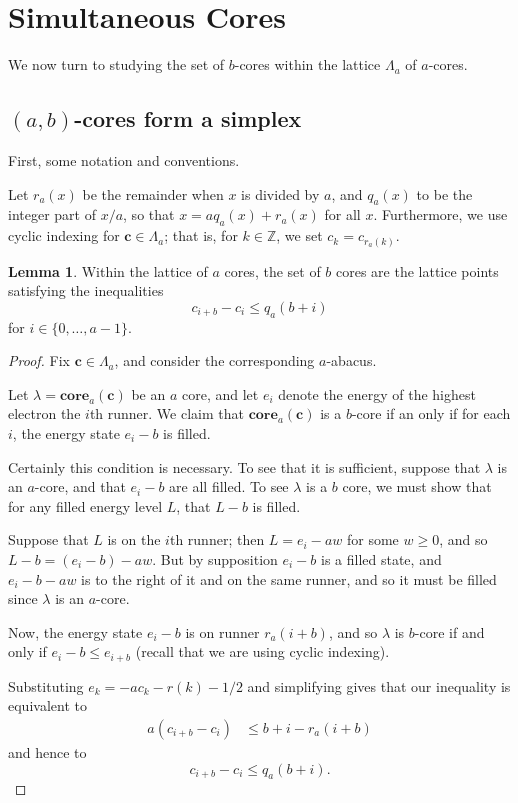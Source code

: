 \documentclass{amsart}[12pt]
\theoremstyle{definition}
\newtheorem{lemma}[dummy]{Lemma}
\newcommand{\Z}{\mathbb{Z}}
\newcommand{\core}{\mathbf{core}}
\begin{document}
\section{Simultaneous Cores}

We now turn to studying the set of $b$-cores within the lattice
$\Lambda_a$ of $a$-cores.
\subsection{\texorpdfstring{$(a,b)$}{(a,b)}-cores form a simplex}

First, some notation and conventions.

Let $r_a(x)$ be the remainder when $x$ is divided by $a$, and $q_a(x)$ to be the integer part of $x/a$, so that $x=aq_a(x)+r_a(x)$ for all $x$.
Furthermore, we use cyclic indexing for $\mathbf{c}\in\Lambda_a$;
that is, for $k\in\Z$, we set $c_k=c_{r_a(k)}$.

\begin{lemma}
Within the lattice of $a$ cores, the set of $b$ cores are the
lattice points satisfying the inequalities $$c_{i+b}-c_{i}\leq q_a(b+i)$$
for $i\in\{0,\dots,a-1\}$.
\end{lemma}

\begin{proof}

Fix $\mathbf{c}\in\Lambda_a$, and consider the corresponding
$a$-abacus.

Let $\lambda=\core_a(\mathbf{c})$ be an $a$ core, and let $e_i$ denote the energy of the highest electron the $i$th runner.  We claim that $\core_a(\mathbf{c})$ is a $b$-core if an only if for each $i$, the energy state $e_i-b$ is filled.

Certainly this condition is necessary.  To see that it is sufficient, suppose that $\lambda$ is an $a$-core, and that $e_i-b$ are all filled.  To see $\lambda$ is a $b$ core, we must show that for any filled energy level $L$, that $L-b$ is filled.  

Suppose that $L$ is on the $i$th runner; then $L=e_i-aw$ for some $w\geq 0$, and so $L-b=(e_i-b)-aw$.  But by supposition $e_i-b$ is a filled state, and $e_i-b-aw$ is to the right of it and on the same runner, and so it must be filled since $\lambda$ is an $a$-core.

Now, the energy state $e_{i}-b$ is on runner $r_a(i+b)$, and so
$\lambda$ is $b$-core if and only if $e_{i}-b\leq e_{i+b}$ (recall that we are using cyclic indexing).

Substituting $e_k=-ac_k-r(k)-1/2$ and simplifying gives that our inequality is equivalent to
\begin{align*}
a(c_{i+b}-c_i)& \leq b+i-r_a(i+b)
\end{align*}
and hence to
$$c_{i+b}-c_i \leq q_a(b+i).$$

\end{proof}
\end{document}
